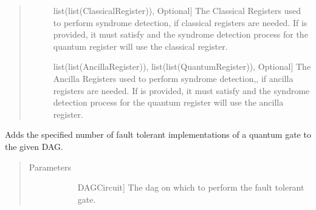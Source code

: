 \documentclass[letterpaper,10pt,english]{sphinxmanual}
\begin{document}
\begin{fulllineitems}
\begin{fulllineitems}
\begin{quote}
\begin{description}
\begin{description}
\item[{}] \leavevmode{[}list(list(ClassicalRegister)), Optional{]}
\sphinxAtStartPar
The Classical Registers used to perform syndrome detection, if classical registers are needed. If  is provided, it must satisfy  and the syndrome detection process for the  quantum register will use the  classical register.

\item[{}] \leavevmode{[}list(list(AncillaRegister)), list(list(QuantumRegister)), Optional{]}
\sphinxAtStartPar
The Ancilla Registers used to perform syndrome detection,, if ancilla registers are needed. If  is provided, it must satisfy  and the syndrome detection process for the  quantum register will use the  ancilla register.

\end{description}

\end{description}\end{quote}

\end{fulllineitems}


\begin{fulllineitems}
\label{\detokenize{Steane:Steane.SteaneFaultTolerantGates.addGateDag}}
\sphinxAtStartPar
Adds the specified number of fault tolerant implementations of a quantum gate to the given DAG.
\begin{quote}\begin{description}
\item[{Parameters}] \leavevmode\begin{description}
\item[{}] \leavevmode{[}DAGCircuit{]}
\sphinxAtStartPar
The dag on which to perform the fault tolerant gate.


\end{description}
\end{description}
\end{quote}
\end{fulllineitems}
\end{fulllineitems}
\end{document}
